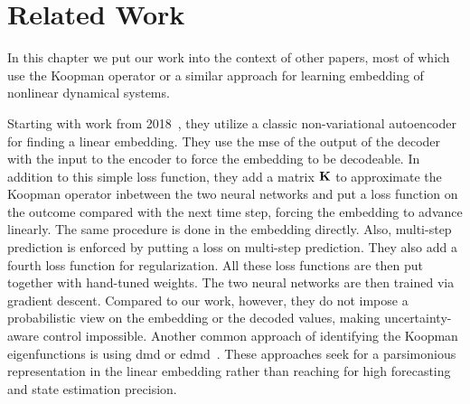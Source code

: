 \chapter{Related Work}
\label{c:relatedWork}



In this chapter we put our work into the context of other papers, most of which use the Koopman operator or a similar approach for learning embedding of nonlinear dynamical systems.

Starting with work from 2018~\cite{luschDeepLearningUniversal2018}, they utilize a classic non-variational autoencoder for finding a linear embedding. They use the \ac{mse} of the output of the decoder with the input to the encoder to force the embedding to be decodeable. In addition to this simple loss function, they add a matrix \(\boldsymbol{\mathrm{K}}\) to approximate the Koopman operator inbetween the two neural networks and put a loss function on the outcome compared with the next time step, forcing the embedding to advance linearly. The same procedure is done in the embedding directly. Also, multi-step prediction is enforced by putting a loss on multi-step prediction. They also add a fourth loss function for regularization. All these loss functions are then put together with hand-tuned weights. The two neural networks are then trained via gradient descent. Compared to our work, however, they do not impose a probabilistic view on the embedding or the decoded values, making uncertainty-aware control impossible. Another common approach of identifying the Koopman eigenfunctions is using \ac{dmd} or \ac{edmd}~\cite{bruntonKoopmanInvariantSubspaces2016,kaiserDatadrivenDiscoveryKoopman2020,williamsDataDrivenApproximation2015}. These approaches seek for a parsimonious representation in the linear embedding rather than reaching for high forecasting and state estimation precision.

